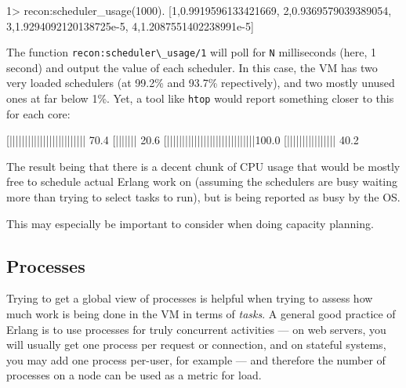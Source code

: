 \documentclass[11pt, oneside]{book}   	%
\newcommand{\app}[1]{\Verb`#1`}
\newcommand{\function}[1]{\Verb`#1`}
\newcommand{\var}[1]{\Verb`#1`}
\begin{document}
\begin{VerbatimEshell}
1> recon:scheduler_usage(1000).
[{1,0.9919596133421669},
 {2,0.9369579039389054},
 {3,1.9294092120138725e-5},
 {4,1.2087551402238991e-5}]
\end{VerbatimEshell}

The function \function{recon:scheduler\_usage/1} will poll for \var{N} milliseconds (here, 1 second) and output the value of each scheduler. In this case, the VM has two very loaded schedulers (at 99.2\% and 93.7\% repectively), and two mostly unused ones at far below 1\%. Yet, a tool like \app{htop} would report something closer to this for each core:

\begin{VerbatimText}
[|||||||||||||||||||||||||     70.4%
[|||||||                       20.6%
[|||||||||||||||||||||||||||||100.0%
[||||||||||||||||              40.2%
\end{VerbatimText}

The result being that there is a decent chunk of CPU usage that would be mostly free to schedule actual Erlang work on (assuming the schedulers are busy waiting more than trying to select tasks to run), but is being reported as busy by the OS.

This may especially be important to consider when doing capacity planning.


\subsection{Processes}
\label{subsec:global-procs}

Trying to get a global view of processes is helpful when trying to assess how much work is being done in the VM in terms of \emph{tasks}. A general good practice of Erlang is to use processes for truly concurrent activities — on web servers, you will usually get one process per request or connection, and on stateful systems, you may add one process per-user, for example — and therefore the number of processes on a node can be used as a metric for load.
\end{document}
